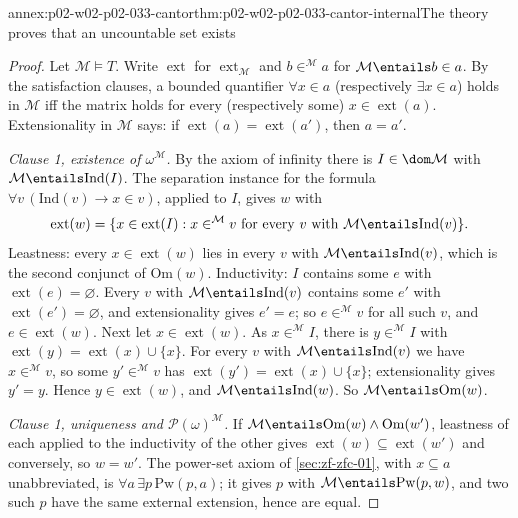 \begin{annexitem}{annex:p02-w02-p02-033-cantor}{thm:p02-w02-p02-033-cantor-internal}{The theory proves that an uncountable set exists}
\begin{proof}
Let \(\mathcal M\models T\).  Write \(\operatorname{ext}\) for
\(\operatorname{ext}_{\mathcal M}\) and \(b\in^{\mathcal M}a\) for
\(\mathcal M\entails b\in a\).  By the satisfaction clauses, a bounded
quantifier \(\forall x\in a\) (respectively \(\exists x\in a\)) holds in
\(\mathcal M\) iff the matrix holds for every (respectively some)
\(x\in\operatorname{ext}(a)\).  Extensionality in \(\mathcal M\) says:
if \(\operatorname{ext}(a)=\operatorname{ext}(a')\), then \(a=a'\).

\emph{Clause 1, existence of \(\omega^{\mathcal M}\).}  By the axiom of
infinity there is \(I\in\dom\mathcal M\) with
\(\mathcal M\entails\mathrm{Ind}(I)\).  The separation instance for the
formula \(\forall v\,(\mathrm{Ind}(v)\to x\in v)\), applied to \(I\), gives
\(w\) with
\[
 \operatorname{ext}(w)=\{x\in\operatorname{ext}(I):
 x\in^{\mathcal M}v\text{ for every }v\text{ with }
 \mathcal M\entails\mathrm{Ind}(v)\}.
\]
Leastness: every \(x\in\operatorname{ext}(w)\) lies in every \(v\) with
\(\mathcal M\entails\mathrm{Ind}(v)\), which is the second conjunct of
\(\mathrm{Om}(w)\).  Inductivity: \(I\) contains some \(e\) with
\(\operatorname{ext}(e)=\varnothing\).  Every \(v\) with
\(\mathcal M\entails\mathrm{Ind}(v)\) contains some \(e'\) with
\(\operatorname{ext}(e')=\varnothing\), and extensionality gives \(e'=e\);
so \(e\in^{\mathcal M}v\) for all such \(v\), and \(e\in\operatorname{ext}(w)\).
Next let \(x\in\operatorname{ext}(w)\).  As \(x\in^{\mathcal M}I\), there is
\(y\in^{\mathcal M}I\) with
\(\operatorname{ext}(y)=\operatorname{ext}(x)\cup\{x\}\).  For every \(v\)
with \(\mathcal M\entails\mathrm{Ind}(v)\) we have \(x\in^{\mathcal M}v\), so
some \(y'\in^{\mathcal M}v\) has
\(\operatorname{ext}(y')=\operatorname{ext}(x)\cup\{x\}\); extensionality
gives \(y'=y\).  Hence \(y\in\operatorname{ext}(w)\), and
\(\mathcal M\entails\mathrm{Ind}(w)\).  So
\(\mathcal M\entails\mathrm{Om}(w)\).

\emph{Clause 1, uniqueness and \(\mathcal P(\omega)^{\mathcal M}\).}  If
\(\mathcal M\entails\mathrm{Om}(w)\land\mathrm{Om}(w')\), leastness of each
applied to the inductivity of the other gives
\(\operatorname{ext}(w)\subseteq\operatorname{ext}(w')\) and conversely, so
\(w=w'\).  The power-set axiom of \cref{sec:zf-zfc-01}, with \(x\subseteq a\)
unabbreviated, is \(\forall a\,\exists p\,\mathrm{Pw}(p,a)\); it gives
\(p\) with \(\mathcal M\entails\mathrm{Pw}(p,w)\), and two such \(p\) have
the same external extension, hence are equal.


\end{proof}
\end{annexitem}
